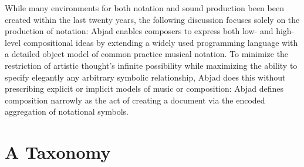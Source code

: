 \documentclass{article}
\begin{document}
While many environments for both notation and sound production been been
created within the last twenty years, the following discussion focuses solely
on the production of notation: Abjad enables composers to express both low- and
high-level compositional ideas by extending a widely used programming language
with a detailed object model of common practice musical notation. To minimize
the restriction of artistic thought's infinite possibility while maximizing the
ability to specify elegantly any arbitrary symbolic relationship, Abjad does
this without prescribing explicit or implicit models of music or composition:
Abjad defines composition narrowly as the act of creating a document via the
encoded aggregation of notational symbols.

\section{A Taxonomy} \label{sec:background}
\end{document}
